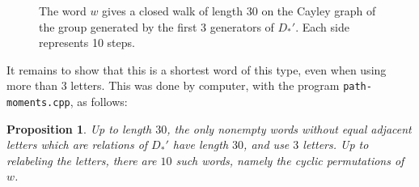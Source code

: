\documentclass[11pt,a4paper]{article}
\newtheorem{prop}[thm]{Proposition}
\begin{document}
\begin{figure}[H]\centering
{}
\caption{The word $w$ gives a closed walk of length 30 on the Cayley graph of the group generated by the first 3 generators of $D_*'$. Each side represents 10 steps.}
\end{figure}

It remains to show that this is a shortest word of this type, even when using more than 3 letters. This was done by computer, with the program \texttt{path-moments.cpp}, as follows:

\begin{prop}\label{path-census}
Up to length $30$, the only nonempty words without equal adjacent letters which are relations of $D_*'$ have length $30$, and use $3$ letters. Up to relabeling the letters, there are $10$ such words, namely the cyclic permutations of $w$.
\end{prop}
\end{document}
